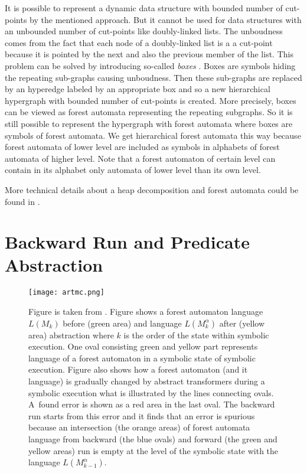 \documentclass[fleqn,11pt]{ExcelAtFIT} %
\begin{document}
It is possible to represent a dynamic data structure with bounded number of cut-points by the mentioned approach.
But it cannot be used for data structures with an unbounded number of cut-points like doubly-linked lists.
The unboudness comes from the fact that each node of a doubly-linked list is a a cut-point because
it is pointed by the next and also the previous member of the list.
This problem can be solved by introducing so-called \emph{boxes} \cite{forester13}.
Boxes are symbols hiding the repeating sub-graphs causing unboudness.
Then these sub-graphs are replaced by an hyperedge labeled by an appropriate box
and so a new hierarchical hypergraph with bounded number of cut-points is created.
More precisely, boxes can be viewed as forest automata representing the repeating subgraphs.
So it is still possible to represent the hypergraph with forest automata where
boxes are symbols of forest automata.
We get hierarchical forest automata this way because forest automata of lower level
are included as symbols in alphabets of forest automata of higher level.
Note that a forest automaton of certain level can contain in its alphabet only automata of lower level than its own level.

More technical details about a heap decomposition and forest automata could be found in \cite{forester11, forester13}.

\section{Backward Run and Predicate Abstraction}
\label{sec:br}

\begin{figure}[t]
	\centering
	\texttt{[image: artmc.png]}
	\caption{
		Figure is taken from \cite{artmc}.
		Figure shows a forest automaton language $L(M_k)$ before (green area)
		and language $L(M_k^{\alpha})$ after (yellow area) abstraction where
		$k$ is the order of the state within symbolic execution.
		One oval consisting green and yellow part represents
		language of a forest automaton in a symbolic state of symbolic execution.
		Figure also shows how a forest automaton (and it language) is gradually changed
		by abstract transformers during a symbolic execution what is illustrated by the lines connecting ovals.
		A~found error is shown as a red area in the last oval.
		The backward run starts from this error and it finds
		that an error is spurious because an intersection (the orange areas) of forest automata language from backward (the blue ovals)
		and forward (the green and yellow areas) run is empty at the level of the symbolic state with the language $L(M^{\alpha}_{k-1})$.}
	\label{fig:bwrun}
\end{figure}
\end{document}
